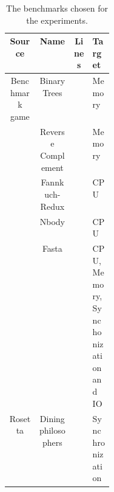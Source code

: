 \begin{table}[ht]
    \centering
    \begin{tabular}{||c | c | c | p{0.2\linewidth}||}
    \hline
    Source & Name & Lines & Target \\[0.5ex] 
    \hline\hline
    Benchmark game & Binary Trees &  & Memory \\
    & Reverse Complement &  & Memory \\
    & Fannkuch-Redux &  & CPU \\
    & Nbody &  & CPU \\
    & Fasta &  & CPU, Memory, Synchonization and IO \\
    Rosetta & Dining philosophers &  & Synchronization \\ [1ex] 
    \hline
    \end{tabular}
    \caption{The benchmarks chosen for the experiments.}
    \label{tab:benchmarks}
\end{table}